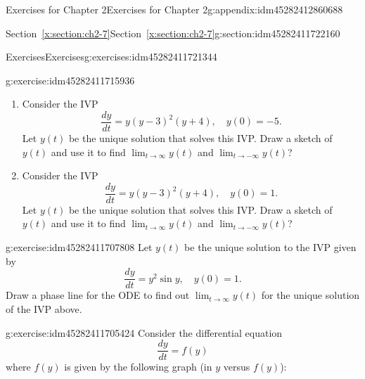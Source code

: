 \documentclass[oneside,10pt,]{book}
\numberwithin{equation}{section}
\numberwithin{equation}{section}
\begin{document}
\begin{appendixptx}{Exercises for Chapter 2}{}{Exercises for Chapter 2}{}{}{g:appendix:idm45282412860688}
\begin{sectionptx}{Section~\ref*{x:section:ch2-7}}{}{Section~\ref*{x:section:ch2-7}}{}{}{g:section:idm45282411722160}
\begin{exercises-subsection-numberless}{Exercises}{}{Exercises}{}{}{g:exercises:idm45282411721344}
\begin{divisionexercise}{2}{}{}{g:exercise:idm45282411715936}
\begin{enumerate}[label=(\alph*)]
\item{}Consider the IVP%
\begin{equation*}
\frac{dy}{dt}=y\left(y-3\right)^{2}\left(y+4\right),\,\,\,\,\,\,y(0)=-5.
\end{equation*}
Let \(y(t)\) be the unique solution that solves this IVP. Draw a sketch of \(y(t)\) and use it to find \(\lim_{t\to\infty}y(t)\) and \(\lim_{t\to-\infty}y(t)\)?%
\item{}Consider the IVP%
\begin{equation*}
\frac{dy}{dt}=y\left(y-3\right)^{2}\left(y+4\right),\,\,\,\,\,\,y(0)=1.
\end{equation*}
Let \(y(t)\) be the unique solution that solves this IVP. Draw a sketch of \(y(t)\) and use it to find \(\lim_{t\to\infty}y(t)\) and \(\lim_{t\to-\infty}y(t)\)?%
\end{enumerate}
\end{divisionexercise}%
\begin{divisionexercise}{3}{}{}{g:exercise:idm45282411707808}%
Let \(y(t)\) be the unique solution to the IVP given by%
\begin{equation*}
\frac{dy}{dt}=y^{2}\sin y,\,\,\,\,\,\,y(0)=1.
\end{equation*}
Draw a phase line for the ODE to find out \(\lim_{t\to\infty}y(t)\) for the unique solution of the IVP above.%
\end{divisionexercise}%
\begin{divisionexercise}{4}{}{}{g:exercise:idm45282411705424}%
Consider the differential equation%
\begin{equation*}
\frac{dy}{dt}=f\left(y\right)
\end{equation*}
where \(f(y)\) is given by the following graph (in \(y\) versus \(f(y)\)):%
\begin{image}{0}{1}{0}%

\end{image}
\end{divisionexercise}
\end{exercises-subsection-numberless}
\end{sectionptx}
\end{appendixptx}
\end{document}
